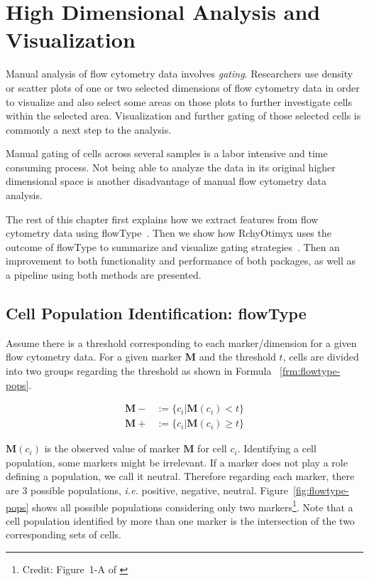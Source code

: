 \section{High Dimensional Analysis and Visualization}
Manual analysis of flow cytometry data involves \emph{gating}. Researchers use density or scatter plots of one or two selected dimensions  of flow cytometry data in order to visualize and also select some areas on those plots to further investigate cells within the selected area. Visualization and further gating of those selected cells is commonly a next step to the analysis.

Manual gating of cells across several samples is a labor intensive and time consuming process. Not being able to analyze the data in its original higher dimensional space is another disadvantage of manual flow cytometry data analysis.

The rest of this chapter first explains how we extract features from flow cytometry data using flowType~\cite{Aghaeepour2012}. Then we show how RchyOtimyx uses the outcome of flowType to summarize and visualize gating strategies~\cite{Aghaeepour2012a}. Then an improvement to both functionality and performance of both packages, as well as a pipeline using both methods are presented.

\subsection{Cell Population Identification: flowType}
\label{sec:fcs:flowType}
Assume there is a threshold corresponding to each marker/dimension for a given flow cytometry data. For a given marker $\mathbf{M}$ and the threshold $t$, cells are divided into two groups regarding the threshold as shown in Formula ~\ref{frm:flowtype-pops}.

\begin{align}
  \mathbf{M-} &:= \{c_i | \mathbf{M}(c_i) < t \} \nonumber \\  
  \mathbf{M+} &:= \{c_i | \mathbf{M}(c_i) \ge t \}
  \label{frm:flowtype-pops}
\end{align}

$\mathbf{M}(c_i)$ is the observed value of marker $\mathbf{M}$ for cell $c_i$. Identifying a cell population, some markers might be irrelevant. If a marker does not play a role defining a population, we call it neutral. Therefore regarding each marker, there are $3$ possible populations, \emph{i.e.} positive, negative, neutral. Figure~\ref{fig:flowtype-pops} shows all possible populations considering only two markers\footnote{Credit: Figure~1-A of \cite{Aghaeepour2012}}. Note that a cell population identified by more than one marker is the intersection of the two corresponding sets of cells.

